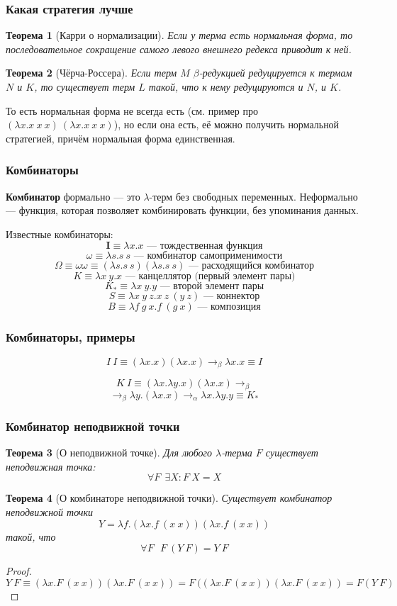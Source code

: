 \documentclass[xetex,mathserif,serif]{beamer}
\newtheorem{rustheorem}{Теорема}
\begin{document}
	\begin{frame}
		\frametitle{Какая стратегия лучше}
		\begin{rustheorem}[Карри о нормализации]
			Если у терма есть нормальная форма, то последовательное сокращение самого левого внешнего 
			редекса приводит к ней.
		\end{rustheorem}
		\begin{rustheorem}[Чёрча-Россера]
			Если терм $M$ $\beta$-редукцией редуцируется к термам $N$ и $K$, то существует терм $L$ такой, что
			к нему редуцируются и $N$, и $K$.
		\end{rustheorem}
		То есть нормальная форма не всегда есть (см. пример про $(\lambda x.x\ x\ x)\ (\lambda x.x\ x\ x)$), но
		если она есть, её можно получить нормальной стратегией, причём нормальная форма единственная.
	\end{frame}

	\begin{frame}
		\frametitle{Комбинаторы}
		\textbf{Комбинатор} формально --- это $\lambda$-терм без свободных переменных. Неформально --- функция,
		которая позволяет комбинировать функции, без упоминания данных.
		
		Известные комбинаторы:
		$$\textbf{I} \equiv \lambda x.x \mbox{ --- тождественная функция}$$
		$$\omega \equiv \lambda s.s\ s \mbox{ --- комбинатор самоприменимости}$$
		$$\Omega \equiv \omega\omega \equiv (\lambda s.s\ s) (\lambda s.s\ s) \mbox{ --- расходящийся комбинатор}$$
		$$K \equiv \lambda x\ y.x \mbox{ --- канцеллятор (первый элемент пары)}$$
		$$K_\ast \equiv \lambda x\ y.y \mbox{ --- второй элемент пары}$$
		$$S \equiv \lambda x\ y\ z. x\ z\ (y\ z) \mbox{ --- коннектор}$$
		$$B \equiv \lambda f\ g\ x. f\ (g\ x) \mbox{ --- композиция}$$		
	\end{frame}
	
	\begin{frame}
		\frametitle{Комбинаторы, примеры}
		$$I\ I \equiv (\lambda x.x) (\lambda x.x) \rightarrow_\beta \lambda x.x \equiv I$$		
				
		$$K\ I \equiv (\lambda x.\lambda y.x) (\lambda x.x) \rightarrow_\beta $$		
		$$\rightarrow_\beta \lambda y.(\lambda x.x) \rightarrow_\alpha \lambda x.\lambda y.y \equiv K_\ast$$		
	\end{frame}
		

	\begin{frame}
		\frametitle{Комбинатор неподвижной точки}
		\begin{rustheorem}[О неподвижной точке]
			Для любого $\lambda$-терма $F$ существует неподвижная точка:
			$$\forall F\ \ \exists X : F\ X = X$$
		\end{rustheorem}
		\begin{rustheorem}[О комбинаторе неподвижной точки]
			Существует комбинатор неподвижной точки
			$$Y = \lambda f.(\lambda x.f\ (x\ x)) (\lambda x.f\ (x\ x))$$
			такой, что 
			$$\forall F\ \ \ F\ (Y\ F) = Y\ F$$
		\end{rustheorem}
		\begin{proof}
			$$Y\ F \equiv (\lambda x.F\ (x\ x))(\lambda x.F\ (x\ x)) 
				= F\ ((\lambda x.F\ (x\ x))(\lambda x.F\ (x\ x)) = F(Y\ F)$$
		\end{proof}
	\end{frame}
\end{document}
